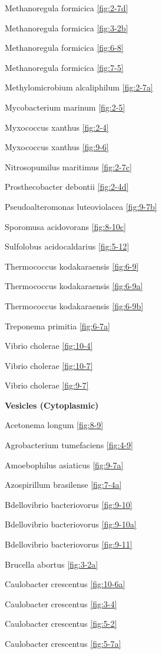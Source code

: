 \documentclass[]{tufte-book}
\begin{document}
Methanoregula formicica \ref{fig:2-7d}

Methanoregula formicica \ref{fig:3-2b}

Methanoregula formicica \ref{fig:6-8}

Methanoregula formicica \ref{fig:7-5}

Methylomicrobium alcaliphilum \ref{fig:2-7a}

Mycobacterium marinum \ref{fig:2-5}

Myxococcus xanthus \ref{fig:2-4}

Myxococcus xanthus \ref{fig:9-6}

Nitrosopumilus maritimus \ref{fig:2-7c}

Prosthecobacter debontii \ref{fig:2-4d}

Pseudoalteromonas luteoviolacea \ref{fig:9-7b}

Sporomusa acidovorans \ref{fig:8-10c}

Sulfolobus acidocaldarius \ref{fig:5-12}

Thermococcus kodakaraensis \ref{fig:6-9}

Thermococcus kodakaraensis \ref{fig:6-9a}

Thermococcus kodakaraensis \ref{fig:6-9b}

Treponema primitia \ref{fig:6-7a}

Vibrio cholerae \ref{fig:10-4}

Vibrio cholerae \ref{fig:10-7}

Vibrio cholerae \ref{fig:9-7}

\textbf{Vesicles (Cytoplasmic)}

Acetonema longum \ref{fig:8-9}

Agrobacterium tumefaciens \ref{fig:4-9}

Amoebophilus asiaticus \ref{fig:9-7a}

Azospirillum brasilense \ref{fig:7-4a}

Bdellovibrio bacteriovorus \ref{fig:9-10}

Bdellovibrio bacteriovorus \ref{fig:9-10a}

Bdellovibrio bacteriovorus \ref{fig:9-11}

Brucella abortus \ref{fig:3-2a}

Caulobacter crescentus \ref{fig:10-6a}

Caulobacter crescentus \ref{fig:3-4}

Caulobacter crescentus \ref{fig:5-2}

Caulobacter crescentus \ref{fig:5-7a}
\end{document}
